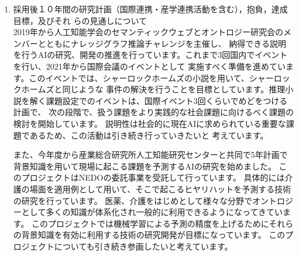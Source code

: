 \documentclass[dvipdfmx]{jlreq}
\begin{document}
\begin{enumerate}
自分の論文や制作物の公開について、「良い評価を得られないから公開したくない」という反応を得たことがあります。
私は、多くの人からフィードバックをもらい、自分の作ったものをより良いものにしていくために公開すると考えています。
そのように学生に伝え、指導していきたいと考えています。これを実現するために講義においても積極的に学外の方との
コミュニケーションを行うことができるようにしたいと考えています。例えば、提出させるレポートを発表形式にし、
知り合いお研究者、技術者に協力をお願いし、ビデオ配信を行い、直接フィードバックを得るようにしたいと考えています。

\item 採用後１０年間の研究計画（国際連携・産学連携活動を含む），抱負，達成目標，及びそれ
らの見通しについて\\
2019年から人工知能学会のセマンティックウェブとオントロジー研究会のメンバーとともにナレッジグラフ推論チャレンジを主催し、
納得できる説明を行うAIの研究、開発の推進を行っています。これまで3回国内でイベントを行い、2021年から国際会議のイベントとして
実施すべく準備を進めています。このイベントでは、シャーロックホームズの小説を用いて、シャーロックホームズと同じような
事件の解決を行うことを目標としています。推理小説を解く課題設定でのイベントは、国際イベント3回くらいでめどをつける計画で、
次の段階で、扱う課題をより実践的な社会課題に向けるべく課題の検討を開始しています。
説明性は社会的に現在AIに求められている重要な課題であるため、この活動は引き続き行っていきたいと
考えています。

また、今年度から産業総合研究所人工知能研究センターと共同で5年計画で背景知識を用いて現場に起こる課題を予測するAIの研究を始めました。
このプロジェクトはNEDOの委託事業を受託して行っています。
具体的には介護の場面を適用例として用いて、そこで起こるヒヤリハットを予測する技術の研究を行っています。
医薬、介護をはじめとして様々な分野でオントロジーとして多くの知識が体系化され一般的に利用できるようになってきています。
このプロジェクトでは機械学習による予測の精度を上げるためにそれらの背景知識を有効に利用する技術の研究開発が目標になっています。
このプロジェクトについても引き続き参画したいと考えています。


\end{enumerate}
\end{document}
